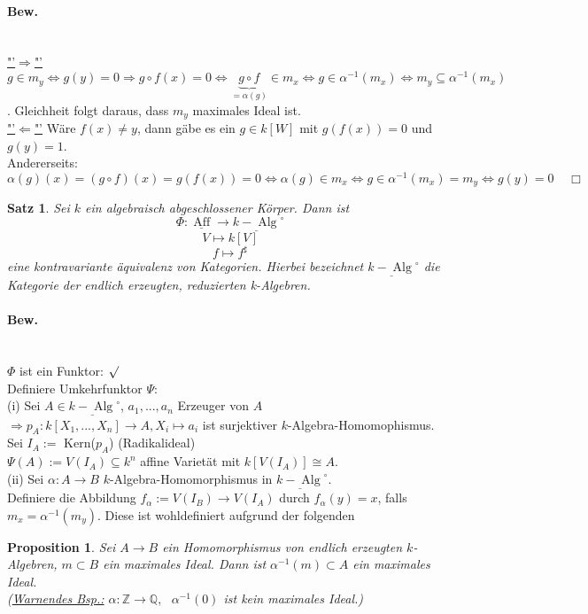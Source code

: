 \documentclass[a4paper,12pt]{report}
\theoremstyle{break}
\newtheorem{Satz}{Satz}
\newtheorem{Prop}[Def]{Proposition}
\theoremstyle{nonumberbreak}
\theoremstyle{nonumberplain}
\begin{document}
\paragraph{Bew.}~\\
\underline{"'$\Rightarrow$"'} $g\in m_y \Leftrightarrow g(y)=0\Rightarrow g\circ f(x)=0 \Leftrightarrow \underbrace{g\circ f}_{= \alpha(g)} \in m_x \Leftrightarrow g\in \alpha^{-1}(m_x) \Leftrightarrow m_y \subseteq \alpha^{-1}(m_x)$. Gleichheit folgt daraus, dass $m_y$ maximales Ideal ist.\\
\underline{"'$\Leftarrow$"'} Wäre $f(x)\neq y$, dann gäbe es  ein $g\in k[W]$ mit $g(f(x))=0$ und $g(y)=1$.\\
Andererseits:\\
$\alpha(g)(x)=(g\circ f)(x)=g(f(x))=0\Leftrightarrow \alpha(g)\in m_x \Leftrightarrow g\in \alpha^{-1}(m_x)=m_y \Leftrightarrow g(y)=0~~~~~\Box$\\
\begin{Satz}
Sei $k$ ein algebraisch abgeschlossener Körper. Dann ist 
$$\Phi:\underline{\operatorname{Aff}} \longrightarrow \underline{k-\operatorname{Alg}}^{\circ}$$
$$V \longmapsto k[V]$$
$$f\longmapsto f^{\sharp}$$
eine kontravariante äquivalenz von Kategorien.
Hierbei bezeichnet $\underline{k-\operatorname{Alg}}^{\circ}$ die Kategorie der endlich erzeugten, reduzierten k-Algebren.
\end{Satz}
\paragraph{Bew.}~\\
$\Phi$ ist ein Funktor: $\surd$\\
Definiere Umkehrfunktor $\Psi$:\\
(i) Sei $A\in \underline{k-\operatorname{Alg}}^{\circ}$, $a_1,...,a_n$ Erzeuger von $A$\\
$\Rightarrow p_A: k[X_1,...,X_n] \rightarrow A, X_i \mapsto a_i$ ist surjektiver $k$-Algebra-Homomophismus.\\
Sei $I_A:=$ Kern($p_A$) (Radikalideal)\\
$\Psi(A):= V(I_A)\subseteq k^n$ affine Varietät mit $k[V(I_A)]\cong A$.\\
(ii) Sei $\alpha: A\rightarrow B$ $k$-Algebra-Homomorphismus in $\underline{k-\operatorname{Alg}}^{\circ}$.\\
Definiere die Abbildung $f_{\alpha} := V(I_B) \rightarrow V(I_A)$ durch $f_{\alpha}(y)=x$, falls $m_x=\alpha^{-1}(m_y)$. Diese ist wohldefiniert aufgrund der folgenden 
\begin{Prop}
Sei $A\rightarrow B$ ein Homomorphismus von endlich erzeugten $k$-Algebren, $m\subset B$ ein maximales Ideal. Dann ist $\alpha^{-1}(m)\subset A$ ein maximales Ideal.\\
(\underline{Warnendes Bsp.:} $\alpha:\mathbb{Z}\rightarrow \mathbb{Q},~~~ \alpha^{-1}(0)$ ist kein maximales Ideal.) 
\end{Prop}
\end{document}
